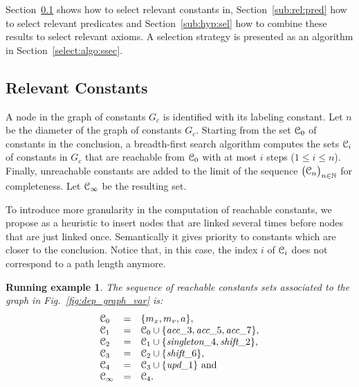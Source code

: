 \documentclass{acm_proc_article-sp}
\theoremstyle{nonumberplain}
\newtheorem{xpl}{Running example}}
\newcommand{\eV}{\EuScript C}
\newcommand{\Nats}[0]{\ensuremath{\mathbb{N}}}
\begin{document}
Section~\ref{sub:rel:var} shows how to select relevant constants in,
Section~\ref{sub:rel:pred} how to select relevant predicates and
Section~\ref{sub:hyp:sel} how to combine these results to select
relevant axioms. A selection strategy is presented as an algorithm in
Section~\ref{select:algo:ssec}.

\subsection{Relevant Constants}\label{sub:rel:var}
A node in the graph of constants $G_c$ is identified with its 
labeling constant. Let $n$ be the diameter of the graph of constants 
$G_c$. Starting from the set \({\eV}_0\) of constants in the 
conclusion, a breadth-first search algorithm computes the sets 
\({\eV}_i\) of constants in $G_c$ that are reachable from \({\eV}_0\) 
with at most $i$ steps ($1 \le i \le n$). Finally, unreachable 
constants are added to the limit of the sequence \( \big( 
{\eV}_n\big)_{n \in \Nats} \) for completeness. Let ${\eV}_{\infty}$ 
be the resulting set.

To introduce more granularity in the computation of reachable
constants, we propose as a heuristic to insert nodes that are linked several 
times before nodes that are just linked once. Semantically it gives 
priority to constants which are closer to the conclusion. Notice 
that, in this case, the index $i$ of \({\eV}_i\) does not correspond 
to a path length anymore.


\begin{xpl}
The sequence of reachable constants sets associated to the
graph in Fig.~\ref{fig:dep_graph_var} is:
\[ 
  \begin{array}{lcl}
    {\eV}_{0} & = & 
    \{ m_x, m_v, a \}, \\
    {\eV}_{1} & = &  
    {\eV}_{0} \cup \{\textit{acc}\_3, \textit{acc}\_5,
    \textit{acc}\_7\}, \\
    {\eV}_{2} & = &  
    {\eV}_{1} \cup \{ \textit{singleton}\_4,
    \textit{shift}\_2 \},\\ 
    {\eV}_{3} & = &  
    {\eV}_{2} \cup \{\textit{shift}\_6 \},\\
    {\eV}_{4} & = &   
    {\eV}_{3} \cup \{\textit{upd}\_1 \} \textrm{ and} \\
    {\eV}_{\infty} & = & {{\eV}_{4}.}
  \end{array}
\]
\end{xpl}
\end{document}
